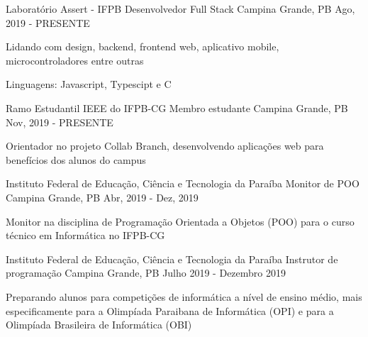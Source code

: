 
\begin{cventries}
  \cventry
    {Laboratório Assert - IFPB} %
    {Desenvolvedor Full Stack} %
    {Campina Grande, PB} %
    {Ago, 2019 - PRESENTE} %
    {
      \begin{cvitems} %
        \item {Lidando com design, backend, frontend web, aplicativo mobile, microcontroladores entre outras}
        \item {Linguagens: Javascript, Typescipt e C}
      \end{cvitems}
    }

  \cventry
    {Ramo Estudantil IEEE do IFPB-CG}
    {Membro estudante}
    {Campina Grande, PB}
    {Nov, 2019 - PRESENTE}
    {
      \begin{cvitems}
        \item {Orientador no projeto Collab Branch, desenvolvendo aplicações web para benefícios dos alunos do campus}
      \end{cvitems}
    }
    
  \cventry
    {Instituto Federal de Educação, Ciência e Tecnologia da Paraíba}
    {Monitor de POO}
    {Campina Grande, PB}
    {Abr, 2019 - Dez, 2019}
    {
      \begin{cvitems}
        \item {Monitor na disciplina de Programação Orientada a Objetos (POO) para o curso técnico em Informática no IFPB-CG}
      \end{cvitems}
    }

  \cventry
    {Instituto Federal de Educação, Ciência e Tecnologia da Paraíba}
    {Instrutor de programação}
    {Campina Grande, PB}
    {Julho 2019 - Dezembro 2019}
    {
      \begin{cvitems}
        \item {Preparando alunos para competições de informática a nível de ensino médio, mais especificamente para a Olimpíada Paraibana de Informática (OPI) e para a Olimpíada Brasileira de Informática (OBI)}
      \end{cvitems}
    }
    
\end{cventries}
